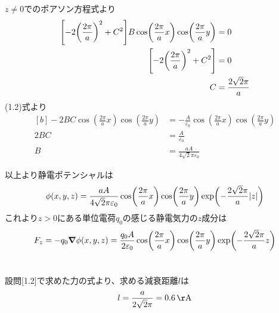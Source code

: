 \documentclass[../../master.tex]{subfiles}
\begin{document}
\(z\neq0\)でのポアソン方程式より
\begin{equation}\begin{aligned}[b]
    \qty[-2\qty(\frac{2\pi}{a})^2+C^2]B\cos(\frac{2\pi}{a}x)\cos(\frac{2\pi}{a}y) &= 0\\
    \qty[-2\qty(\frac{2\pi}{a})^2+C^2] &= 0\\
    C &= \frac{2\sqrt{2}\pi}{a}
\end{aligned}\end{equation}
(1.2)式より
\begin{equation}\begin{aligned}[b]
    -2BC\cos(\frac{2\pi}{a}x)\cos(\frac{2\pi}{a}y)
    &=-\frac{A}{\varepsilon_0}\cos(\frac{2\pi}{a}x)\cos(\frac{2\pi}{a}y)\\
    2BC &= \frac{A}{\varepsilon_0}\\
    B &= \frac{aA}{4\sqrt{2}\pi\varepsilon_0}
\end{aligned}\end{equation}

以上より静電ポテンシャルは
\begin{equation}\begin{aligned}[b]
    \phi(x,y,z) = \frac{aA}{4\sqrt{2}\pi\varepsilon_0}\cos(\frac{2\pi}{a}x)\cos(\frac{2\pi}{a}y)\exp(-\frac{2\sqrt{2}\pi}{a}\abs{z})
\end{aligned}\end{equation}
これより\(z>0\)にある単位電荷\(q_0\)の感じる静電気力の\(z\)成分は
\begin{equation}\begin{aligned}[b]
    F_z = -q_0\grad{\phi(x,y,z)} = \frac{q_0A}{2\varepsilon_0}\cos(\frac{2\pi}{a}x)\cos(\frac{2\pi}{a}y)\exp(-\frac{2\sqrt{2}\pi}{a}z)
\end{aligned}\end{equation}

\section{}
\subsection{}
設問[1.2]で求めた力の式より、求める減衰距離\(l\)は
\begin{equation}\begin{aligned}[b]
    l = \frac{a}{2\sqrt{2}\pi} = 0.6\,\si{\AA}
\end{aligned}\end{equation}
\end{document}
